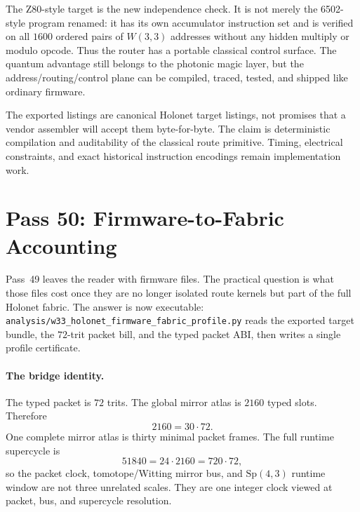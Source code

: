 \documentclass[11pt]{article}
\begin{document}
The Z80-style target is the new independence check.  It is not merely the
6502-style program renamed: it has its own accumulator instruction set and is
verified on all \(1600\) ordered pairs of \(W(3,3)\) addresses without any
hidden multiply or modulo opcode.  Thus the router has a portable classical
control surface.  The quantum advantage still belongs to the photonic magic
layer, but the address/routing/control plane can be compiled, traced, tested,
and shipped like ordinary firmware.

\begin{honestbox}
The exported listings are canonical Holonet target listings, not promises that
a vendor assembler will accept them byte-for-byte.  The claim is deterministic
compilation and auditability of the classical route primitive.  Timing,
electrical constraints, and exact historical instruction encodings remain
implementation work.
\end{honestbox}

\section{Pass 50: Firmware-to-Fabric Accounting}
\label{sec:pass50}
Pass~49 leaves the reader with firmware files.  The practical question is what
those files cost once they are no longer isolated route kernels but part of the
full Holonet fabric.  The answer is now executable:
\texttt{analysis/w33\_holonet\_firmware\_fabric\_profile.py} reads the exported
target bundle, the \(72\)-trit packet bill, and the typed packet ABI, then
writes a single profile certificate.

\paragraph{The bridge identity.}
The typed packet is \(72\) trits.  The global mirror atlas is \(2160\) typed
slots.  Therefore
\[
  2160 = 30\cdot72 .
\]
One complete mirror atlas is thirty minimal packet frames.  The full runtime
supercycle is
\[
  51840 = 24\cdot2160 = 720\cdot72 ,
\]
so the packet clock, tomotope/Witting mirror bus, and \(\mathrm{Sp}(4,3)\)
runtime window are not three unrelated scales.  They are one integer clock
viewed at packet, bus, and supercycle resolution.
\end{document}
